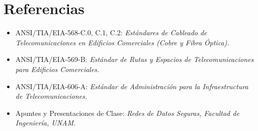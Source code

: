 \documentclass[11pt, letterpaper]{article}
\begin{document}
\section{Referencias}
\begin{itemize}
    \item ANSI/TIA/EIA-568-C.0, C.1, C.2: \textit{Estándares de Cableado de Telecomunicaciones en Edificios Comerciales (Cobre y Fibra Óptica).}
    \item ANSI/TIA/EIA-569-B: \textit{Estándar de Rutas y Espacios de Telecomunicaciones para Edificios Comerciales.}
    \item ANSI/TIA/EIA-606-A: \textit{Estándar de Administración para la Infraestructura de Telecomunicaciones.}
    \item Apuntes y Presentaciones de Clase: \textit{Redes de Datos Seguras, Facultad de Ingeniería, UNAM.}
\end{itemize}
\end{document}
